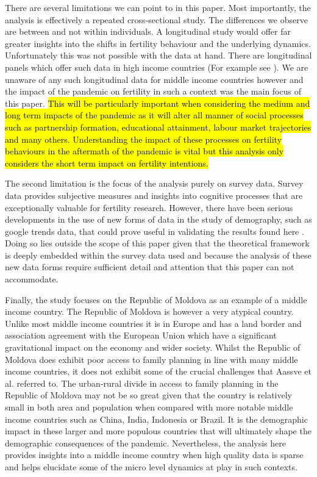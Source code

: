 \documentclass[10pt,letterpaper]{article}
\begin{document}
There are several limitations we can point to in this paper. Most importantly, the analysis is effectively a repeated cross-sectional study. The differences we observe are between and not within individuals. A longitudinal study would offer far greater insights into the shifts in fertility behaviour and the underlying dynamics. Unfortunately this was not possible with the data at hand. There are longitudinal panels which offer such data in high income countries (For example see \cite{luppi2020impact}). We are unaware of any such longitudinal data for middle income countries however and the impact of the pandemic on fertility in such a context was the main focus of this paper. \hl{This will be particularly important when considering the medium and long term impacts of the pandemic as it will alter all manner of social processes such as partnership formation, educational attainment, labour market trajectories and many others. Understanding the impact of these processes on fertility behaviours in the aftermath of the pandemic is vital but this analysis only considers the short term impact on fertility intentions.}

The second limitation is the focus of the analysis purely on survey data. Survey data provides subjective measures and insights into cognitive processes that are exceptionally valuable for fertility research. However, there have been serious developments in the use of new forms of data in the study of demography, such as google trends data, that could prove useful in validating the results found here \cite{alburez2019demography}\cite{wilde2020covid}. Doing so lies outside the scope of this paper given that the theoretical framework is deeply embedded within the survey data used and because the analysis of these new data forms require sufficient detail and attention that this paper can not accommodate. 

Finally, the study focuses on the Republic of Moldova as an example of a middle income country. The Republic of Moldova is however a very atypical country. Unlike most middle income countries it is in Europe and has a land border and association agreement with the European Union which have a significant gravitational impact on the economy and wider society. Whilst the Republic of Moldova does exhibit poor access to family planning in line with many middle income countries, it does not exhibit some of the crucial challenges that Aassve et al. referred to. The urban-rural divide in access to family planning in the Republic of Moldova may not be so great given that the country is relatively small in both area and population when compared with more notable middle income countries such as China, India, Indonesia or Brazil. It is the demographic impact in these larger and more populous countries that will ultimately shape the demographic consequences of the pandemic. Nevertheless, the analysis here provides insights into a middle income country when high quality data is sparse and helps elucidate some of the micro level dynamics at play in such contexts. 
\end{document}

